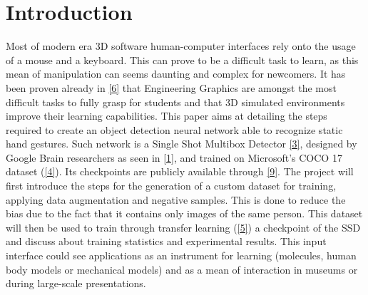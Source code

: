 \documentclass[a4paper, 12pt]{article}
\begin{document}
\section{Introduction}
\begin{flushleft}
Most of modern era 3D software human-computer interfaces rely onto the usage of a mouse and a keyboard. This can prove to be a difficult task to learn, as this mean of manipulation can seems daunting and complex for newcomers.\linebreak
It has been proven already in \hyperref[Ref4]{[6]} that Engineering Graphics are amongst the most difficult tasks to fully grasp for students and that 3D simulated environments improve their learning capabilities.\linebreak
This paper aims at detailing the steps required to create an object detection neural network able to recognize static hand gestures. Such network is a Single Shot Multibox Detector \hyperref[Ref1]{[3]}, designed by Google Brain researchers as seen in \hyperref[RefSSD]{[1]}, and trained on Microsoft's COCO 17 dataset (\hyperref[Ref2]{[4]}). Its checkpoints are publicly available through \hyperref[Ref10]{[9]}.\linebreak
The project will first introduce the steps for the generation of a custom dataset for training, applying data augmentation and negative samples. This is done to reduce the bias due to the fact that it contains only images of the same person. This dataset will then be used to train through transfer learning (\hyperref[Ref3]{[5]}) a checkpoint of the SSD and discuss about training statistics and experimental results.\linebreak
This input interface could see applications as an instrument for learning (molecules, human body models or mechanical models) and as a mean of interaction in museums or during large-scale presentations.
\end{flushleft}
\end{document}
